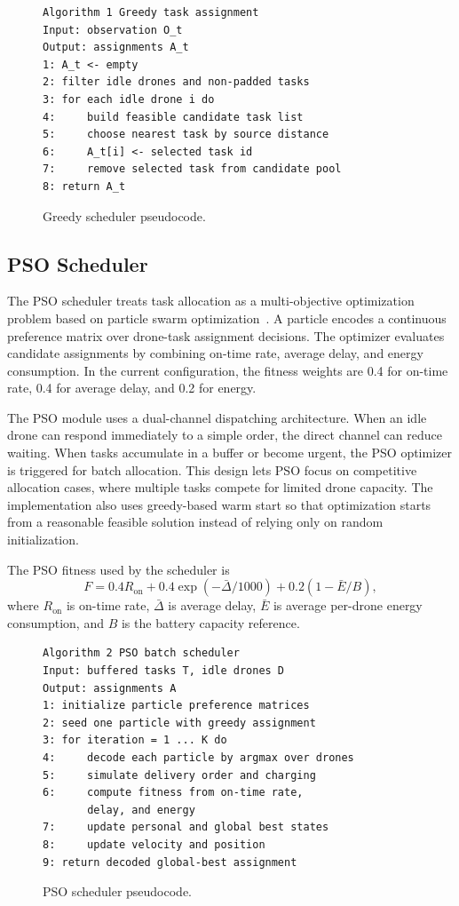 \documentclass[sigconf,balance=false]{aamas}
\begin{document}
\begin{figure}[t]
\small
\begin{verbatim}
Algorithm 1 Greedy task assignment
Input: observation O_t
Output: assignments A_t
1: A_t <- empty
2: filter idle drones and non-padded tasks
3: for each idle drone i do
4:     build feasible candidate task list
5:     choose nearest task by source distance
6:     A_t[i] <- selected task id
7:     remove selected task from candidate pool
8: return A_t
\end{verbatim}
\caption{Greedy scheduler pseudocode.}
\label{fig:greedy-pseudo}
\end{figure}

\subsection{PSO Scheduler}

The PSO scheduler treats task allocation as a multi-objective optimization problem based on particle swarm optimization~\cite{pso}. A particle encodes a continuous preference matrix over drone-task assignment decisions. The optimizer evaluates candidate assignments by combining on-time rate, average delay, and energy consumption. In the current configuration, the fitness weights are 0.4 for on-time rate, 0.4 for average delay, and 0.2 for energy.

The PSO module uses a dual-channel dispatching architecture. When an idle drone can respond immediately to a simple order, the direct channel can reduce waiting. When tasks accumulate in a buffer or become urgent, the PSO optimizer is triggered for batch allocation. This design lets PSO focus on competitive allocation cases, where multiple tasks compete for limited drone capacity. The implementation also uses greedy-based warm start so that optimization starts from a reasonable feasible solution instead of relying only on random initialization.

The PSO fitness used by the scheduler is
\begin{equation}
F=0.4R_{\mathrm{on}}+0.4\exp(-\bar{\Delta}/1000)+0.2\left(1-\bar{E}/B\right),
\end{equation}
where $R_{\mathrm{on}}$ is on-time rate, $\bar{\Delta}$ is average delay, $\bar{E}$ is average per-drone energy consumption, and $B$ is the battery capacity reference.

\begin{figure}[t]
\small
\begin{verbatim}
Algorithm 2 PSO batch scheduler
Input: buffered tasks T, idle drones D
Output: assignments A
1: initialize particle preference matrices
2: seed one particle with greedy assignment
3: for iteration = 1 ... K do
4:     decode each particle by argmax over drones
5:     simulate delivery order and charging
6:     compute fitness from on-time rate,
       delay, and energy
7:     update personal and global best states
8:     update velocity and position
9: return decoded global-best assignment
\end{verbatim}
\caption{PSO scheduler pseudocode.}
\label{fig:pso-pseudo}
\end{figure}
\end{document}
